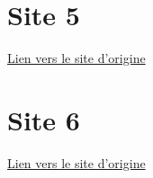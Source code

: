 \documentclass[12pt,a4paper]{exam}%
\newcommand{\chemincode}{code/}
\newcommand{\nomfichier}{pascorrige.py}
\begin{document}
\section{Site 5}
\href{https://pynative.com/python-object-oriented-programming-oop-exercise/#h-oop-exercise-1-create-a-class-with-instance-attributes}{Lien vers le site d'origine}\par
\begin{questions}
	
	
	
\end{questions}
\section{Site 6}
\href{https://github.com/karan/Projects-Solutions}{Lien vers le site d'origine}\par
\begin{questions}
	
	
	
\end{questions}
%
%
%	
%
%
%


%
%
%
%
%
%	
%
%
%
%
%
\end{document}
